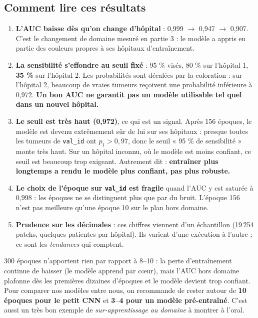\documentclass[11pt,a4paper]{article}
\begin{document}
\subsection{Comment lire ces résultats}
\begin{enumerate}
  \item \textbf{L'AUC baisse dès qu'on change d'hôpital} : 0,999 $\to$ 0,947 $\to$ 0,907. C'est le
        changement de domaine mesuré en partie 3 : le modèle a appris en partie des couleurs propres à ses
        hôpitaux d'entraînement.
  \item \textbf{La sensibilité s'effondre au seuil fixé} : 95 \% visés, 80 \% sur l'hôpital 1, \textbf{35 \%}
        sur l'hôpital 2. Les probabilités sont décalées par la coloration : sur l'hôpital 2, beaucoup de vraies
        tumeurs reçoivent une probabilité inférieure à 0,972. \textbf{Un bon AUC ne garantit pas un modèle
        utilisable tel quel dans un nouvel hôpital.}
  \item \textbf{Le seuil est très haut (0,972)}, ce qui est un signal. Après 156 époques, le modèle est
        devenu extrêmement sûr de lui sur ses hôpitaux : presque toutes les tumeurs de \texttt{val\_id} ont
        $p_1 > 0{,}97$, donc le seuil « 95 \% de sensibilité » monte très haut. Sur un hôpital inconnu, où le
        modèle est moins confiant, ce seuil est beaucoup trop exigeant. Autrement dit : \textbf{entraîner plus
        longtemps a rendu le modèle plus confiant, pas plus robuste.}
  \item \textbf{Le choix de l'époque sur \texttt{val\_id} est fragile} quand l'AUC y est saturée à 0,998 : les
        époques ne se distinguent plus que par du bruit. L'époque 156 n'est pas meilleure qu'une époque 10 sur
        le plan hors domaine.
  \item \textbf{Prudence sur les décimales} : ces chiffres viennent d'un échantillon (19\,254 patchs, quelques
        patientes par hôpital). Ils varient d'une exécution à l'autre ; ce sont les \emph{tendances} qui
        comptent.
\end{enumerate}

\begin{attention}
300 époques n'apportent rien par rapport à 8–10 : la perte d'entraînement continue de baisser (le modèle
apprend par cœur), mais l'AUC hors domaine plafonne dès les premières dizaines d'époques et le modèle devient
trop confiant. Pour comparer nos modèles entre nous, on recommande de rester autour de \textbf{10 époques pour
le petit CNN} et \textbf{3–4 pour un modèle pré-entraîné}. C'est aussi un très bon exemple de
\emph{sur-apprentissage au domaine} à montrer à l'oral.
\end{attention}
\end{document}
